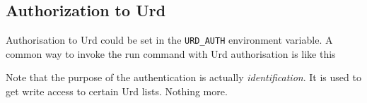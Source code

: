 \subsection{Authorization to Urd}
Authorisation to Urd could be set in the \texttt{URD\_AUTH}
environment variable.  A common way to invoke the run command with Urd
authorisation is like this
\begin{shell}
\end{shell}
Note that the purpose of the authentication is
actually \textsl{identification}.  It is used to get write access to
certain Urd lists.  Nothing more.
